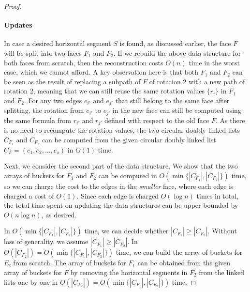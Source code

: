 \documentclass{article}\usepackage[a4paper,margin=20mm]{geometry}
\begin{document}
\begin{proof}
 \paragraph{Updates}
 In case a desired horizontal segment $S$ is found, as discussed earlier, the face $F$ will be split into two faces $F_1$ and $F_2$. If we rebuild the above data structure for both faces from scratch, then the reconstruction costs $O(n)$ time in the worst case, which we cannot afford. A key observation here is that both $F_1$ and $F_2$ can be seen as the result of replacing a subpath of $F$ of rotation $2$ with a new path of rotation $2$, meaning that we can still reuse the same rotation values $\{r_i\}$ in $F_1$ and $F_2$. For any two edges $e_{i'}$ and $e_{j'}$ that still belong to the same face after splitting, the rotation from $e_{i'}$ to $e_{j'}$ in the new face can still be computed using the same formula from $r_{i'}$ and $r_{j'}$ defined with respect to the old face $F$. As there is no need to recompute the rotation values, the two circular doubly linked lists $C_{F_1}$ and $C_{F_2}$ can be computed from the given circular doubly linked list $C_F=(e_1, e_2, \ldots, e_s)$ in $O(1)$ time.

Next, we consider the second part of the data structure. We show that the two arrays of buckets for $F_1$ and $F_2$ can be computed in $O(\min\{|C_{F_1}|, |C_{F_2}|\})$ time, so we can charge the cost to the edges in the \emph{smaller} face, where each edge is charged a cost of $O(1)$. Since each edge is charged $O(\log n)$ times in total, the total time spent on updating the data structures can be upper bounded by $O(n \log n)$, as desired.


In $O(\min\{|C_{F_1}|, |C_{F_2}|\})$ time, we can decide whether $|C_{F_1}| \geq |C_{F_2}|$. Without loss of generality, we assume $|C_{F_1}| \geq |C_{F_2}|$. In $O(|C_{F_2}|) = O(\min\{|C_{F_1}|, |C_{F_2}|\})$ time, we can build the array of buckets for $F_2$ from scratch. The array of buckets for $F_1$ can be obtained from the given array of buckets for $F$ by removing the horizontal segments in $F_2$ from the linked lists one by one in $O(|C_{F_2}|) = O(\min\{|C_{F_1}|, |C_{F_2}|\})$ time.
 
 

\end{proof}
\end{document}

